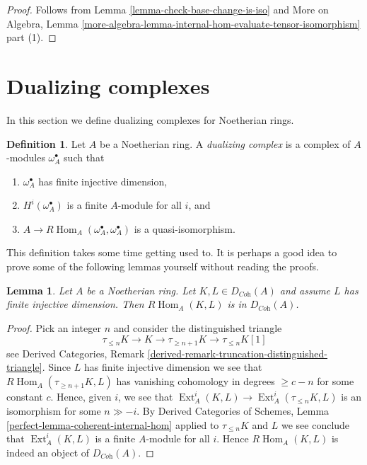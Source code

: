 \documentclass{stacks-project}
\theoremstyle{plain}
\newtheorem{lemma}[subsection]{Lemma}
\theoremstyle{definition}
\newtheorem{definition}[subsection]{Definition}
\theoremstyle{remark}
\numberwithin{equation}{subsection}
\def\Hom{\mathop{\mathrm{Hom}}\nolimits}
\def\Ext{\mathop{\mathrm{Ext}}\nolimits}
\begin{document}
\begin{proof}
Follows from Lemma \ref{lemma-check-base-change-is-iso} and
More on Algebra, Lemma
\ref{more-algebra-lemma-internal-hom-evaluate-tensor-isomorphism} part (1).
\end{proof}







\section{Dualizing complexes}
\label{section-dualizing}

\noindent
In this section we define dualizing complexes for Noetherian rings.

\begin{definition}
\label{definition-dualizing}
Let $A$ be a Noetherian ring. A {\it dualizing complex} is a
complex of $A$-modules $\omega_A^\bullet$ such that
\begin{enumerate}
\item $\omega_A^\bullet$ has finite injective dimension,
\item $H^i(\omega_A^\bullet)$ is a finite $A$-module for all $i$, and
\item $A \to R\Hom_A(\omega_A^\bullet, \omega_A^\bullet)$
is a quasi-isomorphism.
\end{enumerate}
\end{definition}

\noindent
This definition takes some time getting used to. It is perhaps a good
idea to prove some of the following lemmas yourself without reading
the proofs.

\begin{lemma}
\label{lemma-finite-ext-into-bounded-injective}
Let $A$ be a Noetherian ring. Let $K, L \in D_{\textit{Coh}}(A)$
and assume $L$ has finite injective dimension. Then
$R\Hom_A(K, L)$ is in $D_{\textit{Coh}}(A)$.
\end{lemma}

\begin{proof}
Pick an integer $n$ and consider the distinguished triangle
$$
\tau_{\leq n}K \to K \to \tau_{\geq n + 1}K \to \tau_{\leq n}K[1]
$$
see Derived Categories, Remark
\ref{derived-remark-truncation-distinguished-triangle}.
Since $L$ has finite injective dimension we see
that $R\Hom_A(\tau_{\geq n + 1}K, L)$ has vanishing
cohomology in degrees $\geq c - n$ for some constant $c$.
Hence, given $i$, we see that
$\Ext^i_A(K, L) \to \Ext^i_A(\tau_{\leq n}K, L)$
is an isomorphism for some $n \gg - i$. By
Derived Categories of Schemes, Lemma \ref{perfect-lemma-coherent-internal-hom}
applied to $\tau_{\leq n}K$ and $L$
we see conclude that $\Ext^i_A(K, L)$ is
a finite $A$-module for all $i$. Hence $R\Hom_A(K, L)$
is indeed an object of $D_{\textit{Coh}}(A)$.
\end{proof}
\end{document}
